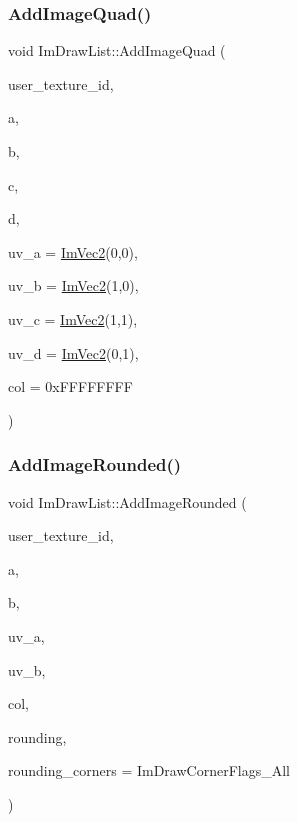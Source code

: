 \subsubsection{\texorpdfstring{Add\+Image\+Quad()}{AddImageQuad()}}
{\footnotesize\ttfamily void Im\+Draw\+List\+::\+Add\+Image\+Quad (\begin{DoxyParamCaption}\item[{Im\+Texture\+ID}]{user\+\_\+texture\+\_\+id,  }\item[{const \hyperlink{struct_im_vec2}{Im\+Vec2} \&}]{a,  }\item[{const \hyperlink{struct_im_vec2}{Im\+Vec2} \&}]{b,  }\item[{const \hyperlink{struct_im_vec2}{Im\+Vec2} \&}]{c,  }\item[{const \hyperlink{struct_im_vec2}{Im\+Vec2} \&}]{d,  }\item[{const \hyperlink{struct_im_vec2}{Im\+Vec2} \&}]{uv\+\_\+a = {\ttfamily \hyperlink{struct_im_vec2}{Im\+Vec2}(0,0)},  }\item[{const \hyperlink{struct_im_vec2}{Im\+Vec2} \&}]{uv\+\_\+b = {\ttfamily \hyperlink{struct_im_vec2}{Im\+Vec2}(1,0)},  }\item[{const \hyperlink{struct_im_vec2}{Im\+Vec2} \&}]{uv\+\_\+c = {\ttfamily \hyperlink{struct_im_vec2}{Im\+Vec2}(1,1)},  }\item[{const \hyperlink{struct_im_vec2}{Im\+Vec2} \&}]{uv\+\_\+d = {\ttfamily \hyperlink{struct_im_vec2}{Im\+Vec2}(0,1)},  }\item[{Im\+U32}]{col = {\ttfamily 0xFFFFFFFF} }\end{DoxyParamCaption})}

\hypertarget{struct_im_draw_list_a1418616a4350bad80b4c751cd8efac30}{}\label{struct_im_draw_list_a1418616a4350bad80b4c751cd8efac30} 
\subsubsection{\texorpdfstring{Add\+Image\+Rounded()}{AddImageRounded()}}
{\footnotesize\ttfamily void Im\+Draw\+List\+::\+Add\+Image\+Rounded (\begin{DoxyParamCaption}\item[{Im\+Texture\+ID}]{user\+\_\+texture\+\_\+id,  }\item[{const \hyperlink{struct_im_vec2}{Im\+Vec2} \&}]{a,  }\item[{const \hyperlink{struct_im_vec2}{Im\+Vec2} \&}]{b,  }\item[{const \hyperlink{struct_im_vec2}{Im\+Vec2} \&}]{uv\+\_\+a,  }\item[{const \hyperlink{struct_im_vec2}{Im\+Vec2} \&}]{uv\+\_\+b,  }\item[{Im\+U32}]{col,  }\item[{float}]{rounding,  }\item[{int}]{rounding\+\_\+corners = {\ttfamily ImDrawCornerFlags\+\_\+All} }\end{DoxyParamCaption})}

